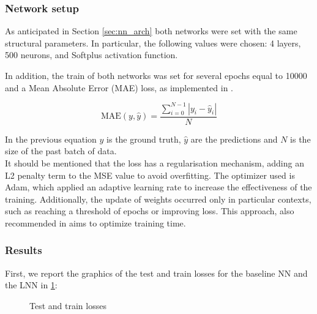 \documentclass[a4paper]{article}
\begin{document}
\subsubsection{Network setup}
\label{sub:rigid_train}
As anticipated in Section \ref{sec:nn_arch} both networks were set with the same structural parameters. In particular, the following values were chosen: 4 layers, 500 neurons, and Softplus activation function.

In addition, the train of both networks was set for several epochs equal to 10000 and a Mean Absolute Error (MAE) loss, as implemented in \cite{lnncranmer}.

\begin{equation}
    \nonumber
    \text{MAE}(y, \hat{y}) = \frac{ \sum_{i=0}^{N - 1} |y_i - \hat{y}_i| }{N}
\end{equation}

In the previous equation $y$ is the ground truth, $\hat{y}$ are the predictions and $N$ is the size of the past batch of data.\\

It should be mentioned that the loss has a regularisation mechanism, adding an L2 penalty term to the MSE value to avoid overfitting.
The optimizer used is Adam, which applied an adaptive learning rate to increase the effectiveness of the training. Additionally, the update of weights occurred only in particular contexts, such as reaching a threshold of epochs or improving loss. This approach, also recommended in \cite{lnncranmer} aims to optimize training time.
\subsubsection{Results}
First, we report the graphics of the test and train losses for the baseline NN and the LNN in \ref{fig:rigid_losses}:

\begin{figure}
    \centering
    \qquad
    \caption{Test and train losses}
    \label{fig:rigid_losses}
\end{figure}
\end{document}
